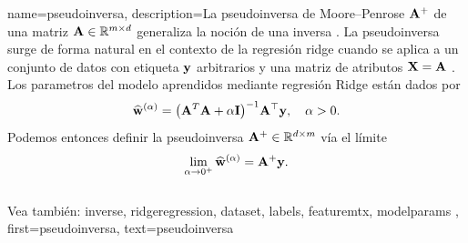 

{name={pseudoinversa},
  description={La pseudoinversa de Moore–Penrose ${\bf A}^{+}$ 
  de una matriz ${\bf A} \in \mathbb{R}^{m \times d}$ generaliza la 
  noción de una inversa \cite{GolubVanLoanBook}. La pseudoinversa surge de forma natural 
  en el contexto de la regresión ridge cuando se aplica a un conjunto de datos con etiqueta ${\bf y}$ 
  arbitrarios y una matriz de atributos ${\bf X} = {\bf A}$ \cite[Cap.\ 3]{hastie01statisticallearning}. 
  Los parametros del modelo aprendidos mediante regresión Ridge están dados por
  	\[
  	\widehat{{\bf w}}^{(\alpha)}  = \big({\bf A}^T {\bf A} + \alpha \mathbf{I} \big)^{-1} {\bf A}^\top {\bf y}, \quad \alpha > 0.
  	\]
  	Podemos entonces definir la pseudoinversa ${\bf A}^+ \in \mathbb{R}^{d \times m}$ vía 
  	el límite \cite[Cap. 3]{benisrael2003generalized}
  	\[
  	\lim_{\alpha \to 0^+} \widehat{{\bf w}}^{(\alpha)} = {\bf A}^+ {\bf y}.
  	\]
	  \\
	  Vea también: \gls{inverse}, \gls{ridgeregression}, \gls{dataset}, \glspl{label}, \gls{featuremtx}, \glspl{modelparam} },
 	first={pseudoinversa},
 	text={pseudoinversa}
 }

